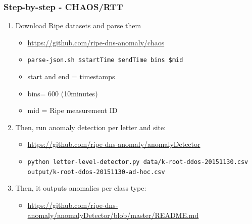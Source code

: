 \documentclass[serif]{beamer}
\begin{document}
\begin{frame}[fragile]
	\frametitle{Step-by-step - CHAOS/RTT}
	
\begin{enumerate}
 \item Download Ripe datasets and parse them
 \begin{itemize}
  \item \url{https://github.com/ripe-dns-anomaly/chaos }
  \item \texttt{parse-json.sh \$startTime \$endTime bins \$mid}
  \item start and end = timestamps
  \item bins= 600 (10minutes)
  \item mid = Ripe measurement ID
 \end{itemize}

 \item Then, run anomaly detection per letter and site:
 \begin{itemize}
  \item \url{https://github.com/ripe-dns-anomaly/anomalyDetector}
  \item \texttt{python letter-level-detector.py data/k-root-ddos-20151130.csv 
output/k-root-ddos-20151130-ad-hoc.csv}
 \end{itemize}

\item Then, it outputs anomalies per class type:
\begin{itemize}
 \item 
\url{https://github.com/ripe-dns-anomaly/anomalyDetector/blob/master/README.md}
\end{itemize}

\end{enumerate}


\end{frame}
\end{document}
